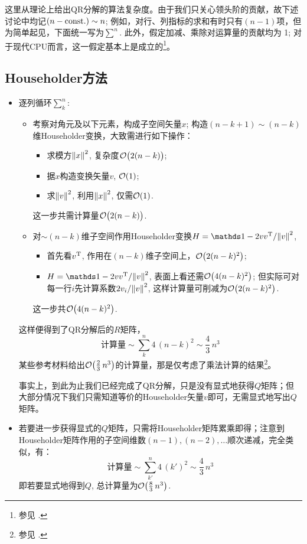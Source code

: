 \documentclass[preview,10pt,border=8pt]{standalone}
\begin{document}
	这里从理论上给出QR分解的算法复杂度。由于我们只关心领头阶的贡献，故下述讨论中均记$(n - \mathrm{const.}) \sim n$; 例如，对行、列指标的求和有时只有$(n-1)$项，但为简单起见，下面统一写为$\sum^n$. 此外，假定加减、乘除对运算量的贡献均为 1; 对于现代CPU而言，这一假定基本上是成立的\footnote{%
		参见 . }。
	\showfootnote
\subsection{Householder方法}
	\begin{itemize}
	\item 逐列循环$\sum_k^n$: 
	\begin{itemize}
	\item 考察对角元及以下元素，构成子空间矢量$x$; 构造$(n-k+1)\sim (n-k)$维Householder变换，大致需进行如下操作：
	\begin{itemize}
	\item 求模方$\norm{x}^2$, 复杂度$\order\big{2(n-k)}$; 
	\item 据$x$构造变换矢量$v$, $\order{1}$; 
	\item 求$\norm{v}^2$, 利用$\norm{x}^2$, 仅需$\order{1}$. 
	\end{itemize}
	这一步共需计算量$\order\big{2(n-k)}$. 
	\item 对$\sim (n-k)$维子空间作用Householder变换$H = \idty - 2vv^\mrm{T}/\norm{v}^2$, 
	\begin{itemize}
	\item 首先看$v^{\mathrm{T}}$, 作用在$(n-k)$维子空间上，$\order\big{2(n-k)^2}$; 
	\item $H = \idty - 2vv^\mrm{T}/\norm{v}^2$, 表面上看还需$\order\big{4(n-k)^2}$; 但实际可对每一行$i$先计算系数$2v_i/\norm{v}^2$, 这样计算量可削减为$\order\big{2(n-k)^2}$. 
	\end{itemize}
	这一步共$\order\big{4(n-k)^2}$. 
	\end{itemize}
	这样便得到了QR分解后的$R$矩阵，
	\begin{equation}
		\textit{计算量} \sim \sum_k^n 4\,(n-k)^2
		\sim \frac{4}{3}\,n^3
	\end{equation}
	某些参考材料给出$\order{\frac{2}{3}\,n^3}$的计算量，那是仅考虑了乘法计算的结果\footnote{参见  . }。
	\showfootnote
	
	事实上，到此为止我们已经完成了QR分解，只是没有显式地获得$Q$矩阵；但大部分情况下我们只需知道等价的Householder矢量$v$即可，无需显式地写出$Q$矩阵。
	\item 若要进一步获得显式的$Q$矩阵，只需将Householder矩阵累乘即得；注意到Householder矩阵作用的子空间维数$(n-1), (n-2), \dots$顺次递减，完全类似，有：
	\begin{equation}
		\textit{计算量} \sim \sum_{k'}^n 4\,(k')^2
		\sim \frac{4}{3}\,n^3
	\end{equation}
	即若要显式地得到$Q$, 总计算量为$\order{\frac{8}{3}\,n^3}$. 
	\end{itemize}
\end{document}
